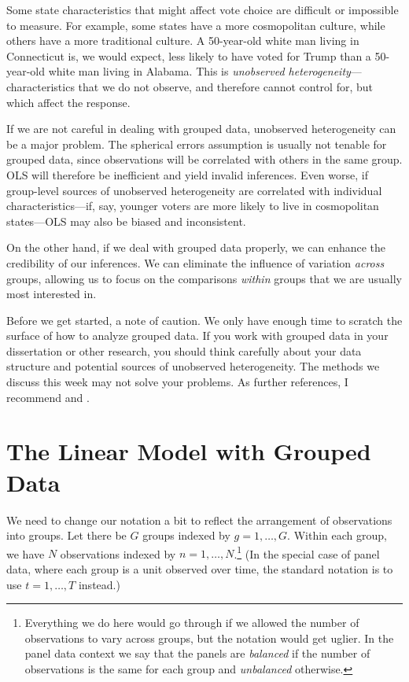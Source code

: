 \documentclass[12pt,oneside,openany]{book}
\begin{document}
Some state characteristics that might affect vote choice are difficult
or impossible to measure. For example, some states have a more
cosmopolitan culture, while others have a more traditional culture. A
50-year-old white man living in Connecticut is, we would expect, less
likely to have voted for Trump than a 50-year-old white man living in
Alabama. This is \emph{unobserved heterogeneity}---characteristics that
we do not observe, and therefore cannot control for, but which affect
the response.

If we are not careful in dealing with grouped data, unobserved
heterogeneity can be a major problem. The spherical errors assumption is
usually not tenable for grouped data, since observations will be
correlated with others in the same group. OLS will therefore be
inefficient and yield invalid inferences. Even worse, if group-level
sources of unobserved heterogeneity are correlated with individual
characteristics---if, say, younger voters are more likely to live in
cosmopolitan states---OLS may also be biased and inconsistent.

On the other hand, if we deal with grouped data properly, we can enhance
the credibility of our inferences. We can eliminate the influence of
variation \emph{across} groups, allowing us to focus on the comparisons
\emph{within} groups that we are usually most interested in.

Before we get started, a note of caution. We only have enough time to
scratch the surface of how to analyze grouped data. If you work with
grouped data in your dissertation or other research, you should think
carefully about your data structure and potential sources of unobserved
heterogeneity. The methods we discuss this week may not solve your
problems. As further references, I recommend \citet{Wooldridge:2002vr}
and \citet{gelman2006data}.

\section{The Linear Model with Grouped
Data}\label{the-linear-model-with-grouped-data}

We need to change our notation a bit to reflect the arrangement of
observations into groups. Let there be \(G\) groups indexed by
\(g = 1, \ldots, G\). Within each group, we have \(N\) observations
indexed by \(n = 1, \ldots, N\).\footnote{Everything we do here would go
  through if we allowed the number of observations to vary across
  groups, but the notation would get uglier. In the panel data context
  we say that the panels are \emph{balanced} if the number of
  observations is the same for each group and \emph{unbalanced}
  otherwise.} (In the special case of panel data, where each group is a
unit observed over time, the standard notation is to use
\(t = 1, \ldots, T\) instead.)
\end{document}
